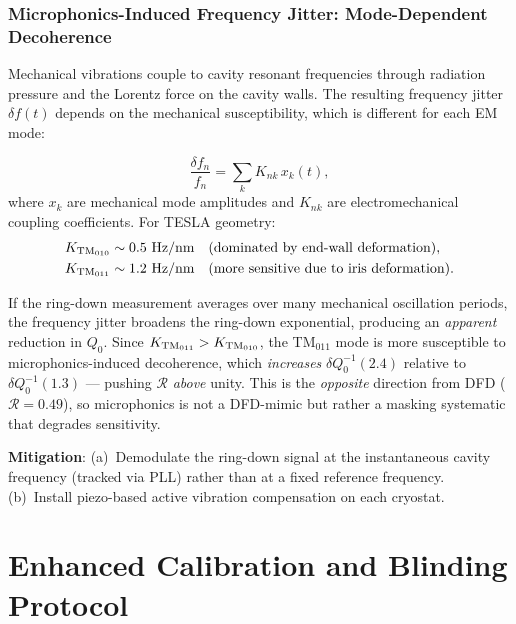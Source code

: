 \documentclass[11pt]{article}
\theoremstyle{definition}
\theoremstyle{remark}
\begin{document}
\section{Microphonics-Induced Frequency Jitter: Mode-Dependent Decoherence}
\label{sec:microphonics}

Mechanical vibrations couple to cavity resonant frequencies through
radiation pressure and the Lorentz force on the cavity walls. The
resulting frequency jitter $\delta f(t)$ depends on the mechanical
susceptibility, which is different for each EM mode:

\begin{equation}
\frac{\delta f_n}{f_n} = \sum_k K_{nk}\,x_k(t),
\end{equation}
where $x_k$ are mechanical mode amplitudes and $K_{nk}$ are
electromechanical coupling coefficients. For TESLA geometry:
\begin{align}
K_{\rm TM_{010}} &\sim 0.5~\text{Hz/nm} \quad\text{(dominated by
  end-wall deformation)}, \\
K_{\rm TM_{011}} &\sim 1.2~\text{Hz/nm} \quad\text{(more sensitive
  due to iris deformation)}.
\end{align}

If the ring-down measurement averages over many mechanical oscillation
periods, the frequency jitter broadens the ring-down exponential,
producing an \emph{apparent} reduction in $Q_0$. Since $K_{\rm TM_{011}}
> K_{\rm TM_{010}}$, the TM$_{011}$ mode is more susceptible to
microphonics-induced decoherence, which \emph{increases}
$\delta Q_0^{-1}(2.4)$ relative to $\delta Q_0^{-1}(1.3)$ --- pushing
$\mathcal{R}$ \emph{above} unity. This is the \emph{opposite} direction
from DFD ($\mathcal{R} = 0.49$), so microphonics is not a DFD-mimic
but rather a masking systematic that degrades sensitivity.

\textbf{Mitigation}: (a)~Demodulate the ring-down signal at the
instantaneous cavity frequency (tracked via PLL) rather than at
a fixed reference frequency. (b)~Install piezo-based active
vibration compensation on each cryostat.


\part{Enhanced Calibration and Blinding Protocol}
\label{part:calibration}
\end{document}
